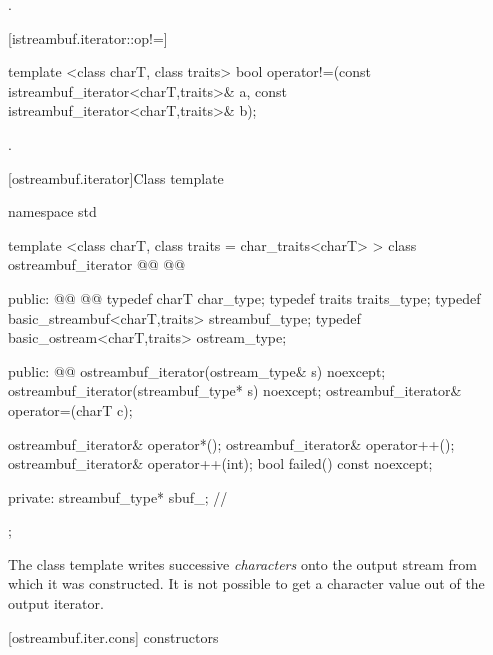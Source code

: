 \begin{itemdescr}
\pnum
\returns
{}.
\end{itemdescr}

[istreambuf.iterator::op!=]{}

%
\begin{itemdecl}
template <class charT, class traits>
  bool operator!=(const istreambuf_iterator<charT,traits>& a,
                  const istreambuf_iterator<charT,traits>& b);
\end{itemdecl}

\begin{itemdescr}
\pnum
\returns
{}.
\end{itemdescr}

[ostreambuf.iterator]{Class template }

%
\begin{codeblock}
namespace std {
  template <class charT, class traits = char_traits<charT> >
  class ostreambuf_iterator @\removed{:}@
    @@ {
  public:
    @@
    @@
    typedef charT                         char_type;
    typedef traits                        traits_type;
    typedef basic_streambuf<charT,traits> streambuf_type;
    typedef basic_ostream<charT,traits>   ostream_type;

  public:
    @@
    ostreambuf_iterator(ostream_type& s) noexcept;
    ostreambuf_iterator(streambuf_type* s) noexcept;
    ostreambuf_iterator& operator=(charT c);

    ostreambuf_iterator& operator*();
    ostreambuf_iterator& operator++();
    ostreambuf_iterator& operator++(int);
    bool failed() const noexcept;

  private:
    streambuf_type* sbuf_;                // \expos
  };
}
\end{codeblock}

\pnum
The
class template
writes successive
\textit{characters}
onto the output stream from which it was constructed.
It is not possible to get a character value out of the output iterator.

[ostreambuf.iter.cons]{ constructors}

